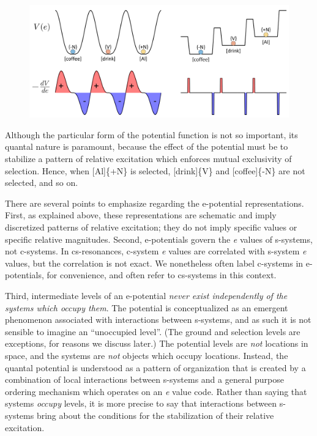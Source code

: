   
\begin{figure}
\includegraphics[width=\textwidth]{figures/Tilsen-img24.png}
\caption{\missingcaption}
\label{fig:}
\end{figure}
 

  Although the particular form of the potential function is not so important, its quantal nature is paramount, because the effect of the potential must be to stabilize a pattern of relative excitation which enforces mutual exclusivity of selection. Hence, when [Al]\{+N\} is selected, [drink]\{V\} and [coffee]\{-N\} are not selected, and so on. 

  There are several points to emphasize regarding the e-potential representations. First, as explained above, these representations are schematic and imply discretized patterns of relative excitation; they do not imply specific values or specific relative magnitudes. Second, e-potentials govern the \textit{e} values of s-systems, not c-systems. In cs-resonances, c-system \textit{e} values are correlated with s-system \textit{e} values, but the correlation is not exact. We nonetheless often label c-systems in e-potentials, for convenience, and often refer to cs-systems in this context. 

  Third, intermediate levels of an e-potential \textit{never exist independently of the systems which occupy them}. The potential is conceptualized as an emergent phenomenon associated with interactions between s-systems, and as such it is not sensible to imagine an “unoccupied level”. (The ground and selection levels are exceptions, for reasons we discuss later.) The potential levels are \textit{not} locations in space, and the systems are \textit{not} objects which occupy locations. Instead, the quantal potential is understood as a pattern of organization that is created by a combination of local interactions between s-systems and a general purpose ordering mechanism which operates on an \textit{e} value code. Rather than saying that systems \textit{occupy} levels, it is more precise to say that interactions between s-systems bring about the conditions for the stabilization of their relative excitation.


